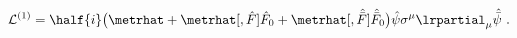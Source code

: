 \begin{equation}
  \label{eq:ord1orig}
  \mathcal{L}^{(1)} = \half{i} \bigl( \metrhat  + \metrhat[, \hat{F}]
    \hat{F}_0 + \metrhat[, \Hat{\Bar{F}}]
    \Hat{\Bar{F}}_0 \bigr)\hat{\psi} \sigma^\mu \lrpartial_\mu
    \Hat{\Bar{\psi}}\ .
\end{equation}

